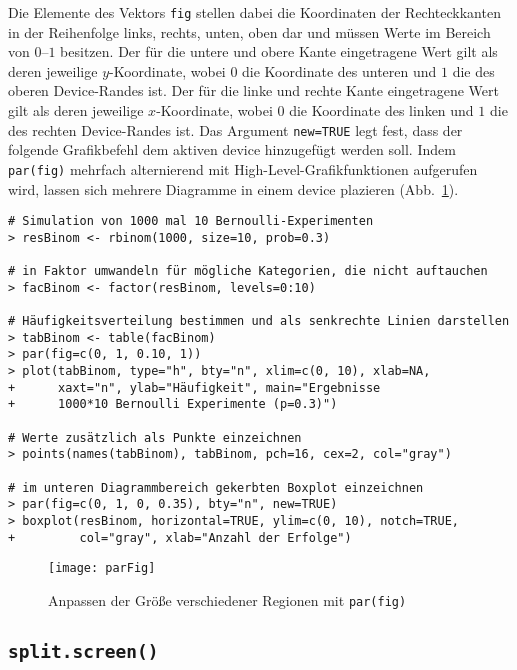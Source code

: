 Die Elemente des Vektors \lstinline!fig! stellen dabei die Koordinaten der Rechteckkanten in der Reihenfolge links, rechts, unten, oben dar und müssen Werte im Bereich von $0$--$1$ besitzen. Der für die untere und obere Kante eingetragene Wert gilt als deren jeweilige $y$-Koordinate, wobei $0$ die Koordinate des unteren und $1$ die des oberen Device-Randes ist. Der für die linke und rechte Kante eingetragene Wert gilt als deren jeweilige $x$-Koordinate, wobei $0$ die Koordinate des linken und $1$ die des rechten Device-Randes ist. Das Argument \lstinline!new=TRUE! legt fest, dass der folgende Grafikbefehl dem aktiven device hinzugefügt werden soll. Indem \lstinline!par(fig)! mehrfach alternierend mit High-Level-Grafikfunktionen aufgerufen wird, lassen sich mehrere Diagramme in einem device plazieren (Abb.\ \ref{fig:parFig}).
\begin{lstlisting}
# Simulation von 1000 mal 10 Bernoulli-Experimenten
> resBinom <- rbinom(1000, size=10, prob=0.3)

# in Faktor umwandeln für mögliche Kategorien, die nicht auftauchen
> facBinom <- factor(resBinom, levels=0:10)

# Häufigkeitsverteilung bestimmen und als senkrechte Linien darstellen
> tabBinom <- table(facBinom)
> par(fig=c(0, 1, 0.10, 1))
> plot(tabBinom, type="h", bty="n", xlim=c(0, 10), xlab=NA,
+      xaxt="n", ylab="Häufigkeit", main="Ergebnisse
+      1000*10 Bernoulli Experimente (p=0.3)")

# Werte zusätzlich als Punkte einzeichnen
> points(names(tabBinom), tabBinom, pch=16, cex=2, col="gray")

# im unteren Diagrammbereich gekerbten Boxplot einzeichnen
> par(fig=c(0, 1, 0, 0.35), bty="n", new=TRUE)
> boxplot(resBinom, horizontal=TRUE, ylim=c(0, 10), notch=TRUE,
+         col="gray", xlab="Anzahl der Erfolge")
\end{lstlisting}

\begin{figure}[ht]
\centering
\texttt{[image: parFig]}
\vspace*{-1em}
\caption{Anpassen der Größe verschiedener Regionen mit \lstinline!par(fig)!}
\label{fig:parFig}
\end{figure}

\subsection{\texttt{split.screen()}}

